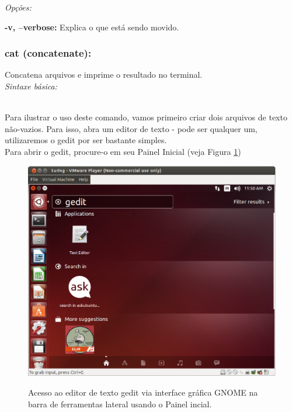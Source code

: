 \begin{refsection}
\textit{Opções:}

 \textbf{-v, --verbose:} Explica o que está sendo movido.\\

\subsubsection{cat (concatenate):}\label{tut1:text_mode:commands:cat}

 Concatena arquivos e imprime o resultado no terminal.\\

\textit{Sintaxe básica:}

 \\
Para ilustrar o uso deste comando, vamos primeiro criar dois arquivos de texto não-vazios. Para isso, abra um editor de texto - pode ser qualquer um, utilizaremos o gedit por ser bastante simples.\\
 Para abrir o gedit, procure-o em seu Painel Inicial (veja Figura \ref{tut1:fig:gedit})

  \begin{figure}[H]
      {\includegraphics[scale=0.35]{figures/tut1/gedit.eps}}
      {\caption[\textit{Acesso ao gedit via interface gráfica GNOME usando o Painel incial}]{Acesso ao editor de texto gedit via interface gráfica GNOME na barra de ferramentas lateral  usando o Painel incial.}\label{tut1:fig:gedit}}
  \end{figure}


\end{refsection}

